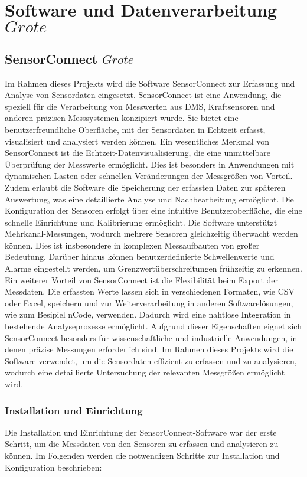 \chapter{Software und Datenverarbeitung \(Grote\)}

\section{SensorConnect \(Grote\)}
Im Rahmen dieses Projekts wird die Software SensorConnect zur Erfassung und Analyse von Sensordaten eingesetzt. SensorConnect ist eine Anwendung, die speziell für die Verarbeitung von Messwerten aus DMS, Kraftsensoren und anderen präzisen Messsystemen konzipiert wurde. Sie bietet eine benutzerfreundliche Oberfläche, mit der Sensordaten in Echtzeit erfasst, visualisiert und analysiert werden können. Ein wesentliches Merkmal von SensorConnect ist die Echtzeit-Datenvisualisierung, die eine unmittelbare Überprüfung der Messwerte ermöglicht. Dies ist besonders in Anwendungen mit dynamischen Lasten oder schnellen Veränderungen der Messgrößen von Vorteil. Zudem erlaubt die Software die Speicherung der erfassten Daten zur späteren Auswertung, was eine detaillierte Analyse und Nachbearbeitung ermöglicht. Die Konfiguration der Sensoren erfolgt über eine intuitive Benutzeroberfläche, die eine schnelle Einrichtung und Kalibrierung ermöglicht. Die Software unterstützt Mehrkanal-Messungen, wodurch mehrere Sensoren gleichzeitig überwacht werden können. Dies ist insbesondere in komplexen Messaufbauten von großer Bedeutung. Darüber hinaus können benutzerdefinierte Schwellenwerte und Alarme eingestellt werden, um Grenzwertüberschreitungen frühzeitig zu erkennen. Ein weiterer Vorteil von SensorConnect ist die Flexibilität beim Export der Messdaten. Die erfassten Werte lassen sich in verschiedenen Formaten, wie CSV oder Excel, speichern und zur Weiterverarbeitung in anderen Softwarelösungen, wie zum Besipiel nCode, verwenden. Dadurch wird eine nahtlose Integration in bestehende Analyseprozesse ermöglicht. Aufgrund dieser Eigenschaften eignet sich SensorConnect besonders für wissenschaftliche und industrielle Anwendungen, in denen präzise Messungen erforderlich sind. Im Rahmen dieses Projekts wird die Software verwendet, um die Sensordaten effizient zu erfassen und zu analysieren, wodurch eine detaillierte Untersuchung der relevanten Messgrößen ermöglicht wird.

\subsection{Installation und Einrichtung}
Die Installation und Einrichtung der SensorConnect-Software war der erste Schritt, um die Messdaten von den Sensoren zu erfassen und analysieren zu können. Im Folgenden werden die notwendigen Schritte zur Installation und Konfiguration beschrieben:


